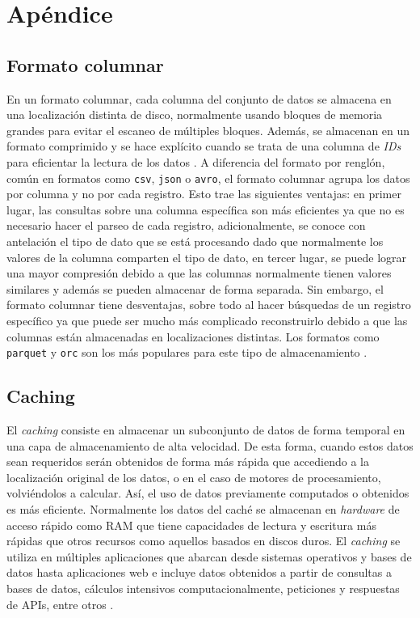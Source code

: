 \chapter{Apéndice}

\section{Formato columnar\label{formatocolumnar}}

\noindent En un formato columnar, cada columna del conjunto de datos se almacena en una localización distinta de disco, normalmente usando bloques de memoria grandes para evitar el escaneo de múltiples bloques. Además, se almacenan en un formato comprimido y se hace explícito cuando se trata de una columna de \textit{IDs} para eficientar la lectura de los datos \cite{column-oriented}. A diferencia del formato por renglón, común en formatos como \texttt{csv}, \texttt{json} o \texttt{avro}, el formato columnar agrupa los datos por columna y no por cada registro. Esto trae las siguientes ventajas: en primer lugar, las consultas sobre una columna específica son más eficientes ya que no es necesario hacer el parseo de cada registro, adicionalmente, se conoce con antelación el tipo de dato que se está procesando dado que normalmente los valores de la columna comparten el tipo de dato, en tercer lugar, se puede lograr una mayor compresión debido a que las columnas normalmente tienen valores similares y además se pueden almacenar de forma separada. Sin embargo, el formato columnar tiene desventajas, sobre todo al hacer búsquedas de un registro específico ya que puede ser mucho más complicado reconstruirlo debido a que las columnas están almacenadas en localizaciones distintas. Los formatos como \texttt{parquet} y \texttt{orc} son los más populares para este tipo de almacenamiento \cite{columnar-storage-blog}.

\section{Caching \label{caching}}

El \textit{caching} consiste en almacenar un subconjunto de datos de forma temporal en una capa de almacenamiento de alta velocidad. De esta forma, cuando estos datos sean requeridos serán obtenidos de forma más rápida que accediendo a la localización original de los datos, o en el caso de motores de procesamiento, volviéndolos a calcular. Así, el uso de datos previamente computados o obtenidos es más eficiente. Normalmente los datos del caché se almacenan en \textit{hardware} de acceso rápido como RAM que tiene capacidades de lectura y escritura más rápidas que otros recursos como aquellos basados en discos duros. El \textit{caching} se utiliza en múltiples aplicaciones que abarcan desde sistemas operativos y bases de datos hasta aplicaciones web e incluye datos obtenidos a partir de consultas a bases de datos, cálculos intensivos computacionalmente, peticiones y respuestas de APIs, entre otros \cite{aws-caching}. 
